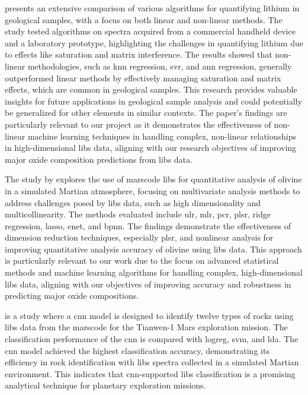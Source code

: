 \citet{ferreiraComprehensiveComparisonLinear2022} presents an extensive comparison of various algorithms for quantifying lithium in geological samples, with a focus on both linear and non-linear methods.
The study tested algorithms on spectra acquired from a commercial handheld device and a laboratory prototype, highlighting the challenges in quantifying lithium due to effects like saturation and matrix interference.
The results showed that non-linear methodologies, such as \gls{knn} regression, \gls{svr}, and \gls{ann} regression, generally outperformed linear methods by effectively managing saturation and matrix effects, which are common in geological samples.
This research provides valuable insights for future applications in geological sample analysis and could potentially be generalized for other elements in similar contexts.
The paper's findings are particularly relevant to our project as it demonstrates the effectiveness of non-linear machine learning techniques in handling complex, non-linear relationships in high-dimensional \gls{libs} data, aligning with our research objectives of improving major oxide composition predictions from \gls{libs} data.

The study by \citet{liuComparisonQuantitativeAnalysis2022} explores the use of \gls{marscode} \gls{libs} for quantitative analysis of olivine in a simulated Martian atmosphere, focusing on multivariate analysis methods to address challenges posed by \gls{libs} data, such as high dimensionality and multicollinearity.
The methods evaluated include \gls{ulr}, \gls{mlr}, \gls{pcr}, \gls{plsr}, ridge regression, \gls{lasso}, \gls{enet}, and \gls{bpnn}.
The findings demonstrate the effectiveness of dimension reduction techniques, especially \gls{plsr}, and nonlinear analysis for improving quantitative analysis accuracy of olivine using \gls{libs} data.
This approach is particularly relevant to our work due to the focus on advanced statistical methods and machine learning algorithms for handling complex, high-dimensional \gls{libs} data, aligning with our objectives of improving accuracy and robustness in predicting major oxide compositions.

\cite{yangConvolutionalNeuralNetwork2022} is a study where a \gls{cnn} model is designed to identify twelve types of rocks using \gls{libs} data from the \gls{marscode} for the Tianwen-1 Mars exploration mission.
The classification performance of the \gls{cnn} is compared with \gls{logreg}, \gls{svm}, and \gls{lda}.
The \gls{cnn} model achieved the highest classification accuracy, demonstrating its efficiency in rock identification with \gls{libs} spectra collected in a simulated Martian environment.
This indicates that \gls{cnn}-supported \gls{libs} classification is a promising analytical technique for planetary exploration missions.

